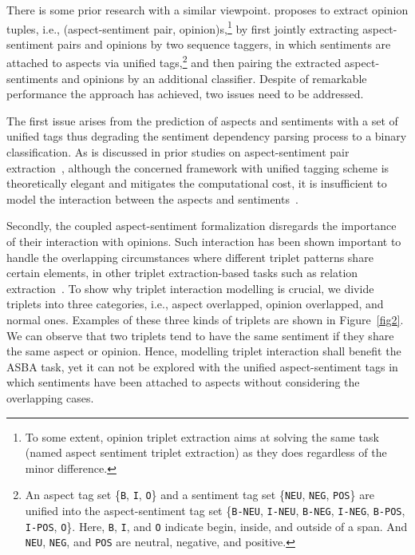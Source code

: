 \documentclass[11pt,a4paper]{article}
\begin{document}
There is some prior research with a similar viewpoint.  proposes to extract opinion tuples, i.e., (aspect-sentiment pair, opinion)s,\footnote{To some extent, opinion triplet extraction aims at solving the same task (named aspect sentiment triplet extraction) as they does regardless of the minor difference.} by first jointly extracting aspect-sentiment pairs and opinions by two sequence taggers, in which sentiments are attached to aspects via unified tags,\footnote{An aspect tag set \{\texttt{B}, \texttt{I}, \texttt{O}\} and a sentiment tag set \{\texttt{NEU}, \texttt{NEG}, \texttt{POS}\} are unified into the aspect-sentiment tag set \{\texttt{B-NEU}, \texttt{I-NEU}, \texttt{B-NEG}, \texttt{I-NEG}, \texttt{B-POS}, \texttt{I-POS}, \texttt{O}\}. Here, \texttt{B}, \texttt{I}, and \texttt{O} indicate begin, inside, and outside of a span. And \texttt{NEU}, \texttt{NEG}, and \texttt{POS} are neutral, negative, and positive.} and then pairing the extracted aspect-sentiments and
opinions by an additional classifier. Despite of remarkable performance the approach has achieved, two issues need to be addressed.

The first issue arises from the prediction of aspects and sentiments with a set of unified tags thus degrading the sentiment dependency parsing process to a binary classification. As is discussed in prior studies on aspect-sentiment pair extraction~\cite{he2019interactive,luo2019doer,hu2019open}, although the concerned framework with unified tagging scheme is theoretically  elegant and mitigates the computational cost, it is insufficient to model the interaction between the aspects and sentiments~\cite{he2019interactive,luo2019doer}.

Secondly, the coupled aspect-sentiment formalization disregards the importance of their interaction with opinions. Such interaction has been shown important to handle the overlapping circumstances where different triplet patterns share certain elements, in other triplet extraction-based tasks such as relation extraction~\cite{fu2019graphrel}. To show why triplet interaction modelling is crucial, we divide triplets into three categories, i.e., aspect overlapped, opinion overlapped, and normal ones. Examples of these three kinds of triplets are shown in Figure~\ref{fig2}. We can observe that two triplets tend to have the same sentiment if they share the same aspect or opinion. Hence, modelling triplet interaction shall benefit the ASBA task, yet it can not be explored with the unified aspect-sentiment tags in which sentiments have been attached to aspects without considering the overlapping cases.
\end{document}
